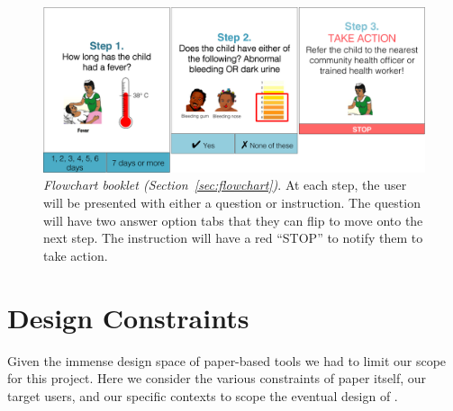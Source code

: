 \documentclass{sig-alternate}
\begin{document}
\begin{figure}
\centering
\includegraphics[width=\linewidth]{img/flowchart.png}
\caption{\emph{Flowchart booklet (Section~\ref{sec:flowchart})}. At each step, the user will be presented with either a question or instruction. The question will have two answer option tabs that they can flip to move onto the next step. The instruction will have a red ``STOP'' to notify them to take action.}
\label{fig:flowchart}
\end{figure}


\section{Design Constraints}
\label{sec:constraints}

Given the immense design space of paper-based tools we had to limit our scope for this project. 
Here we consider the various constraints of paper itself, our target users, and our specific contexts to scope the eventual design of \nifty.


\end{document}
